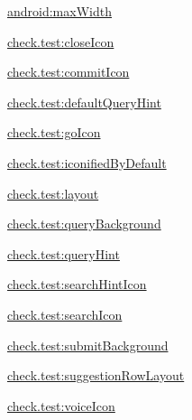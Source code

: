 {\ttfamily \hyperlink{classcheck_1_1test_1_1_r_1_1styleable_a77f942b17351847bdbed74d6b26c17e2}{android\+:max\+Width}}

{\ttfamily \hyperlink{classcheck_1_1test_1_1_r_1_1styleable_adda1bbb19f8d55c5be43c305e20f2e18}{check.\+test\+:close\+Icon}}

{\ttfamily \hyperlink{classcheck_1_1test_1_1_r_1_1styleable_a31409b8f7f4cf0147ae878cb9dd11c99}{check.\+test\+:commit\+Icon}}

{\ttfamily \hyperlink{classcheck_1_1test_1_1_r_1_1styleable_a25fc4426b5d6f7fd9c05b2c7b543a9c7}{check.\+test\+:default\+Query\+Hint}}

{\ttfamily \hyperlink{classcheck_1_1test_1_1_r_1_1styleable_aa1834df2b3dd894df7c2d6e194cf864a}{check.\+test\+:go\+Icon}}

{\ttfamily \hyperlink{classcheck_1_1test_1_1_r_1_1styleable_aa8cd4a6d1145a57929dc88b7db75616a}{check.\+test\+:iconified\+By\+Default}}

{\ttfamily \hyperlink{classcheck_1_1test_1_1_r_1_1styleable_a43de74d589f89c8acfb186f9078f5192}{check.\+test\+:layout}}

{\ttfamily \hyperlink{classcheck_1_1test_1_1_r_1_1styleable_ae1dc74a07b7705c97c66e2f4ed17ee37}{check.\+test\+:query\+Background}}

{\ttfamily \hyperlink{classcheck_1_1test_1_1_r_1_1styleable_a81a033a05b9ad3bb82d2aa9daa757cfb}{check.\+test\+:query\+Hint}}

{\ttfamily \hyperlink{classcheck_1_1test_1_1_r_1_1styleable_ad0538833b27a29b6c19c419c1e948765}{check.\+test\+:search\+Hint\+Icon}}

{\ttfamily \hyperlink{classcheck_1_1test_1_1_r_1_1styleable_ab032023905a333c304872772b4b7aa87}{check.\+test\+:search\+Icon}}

{\ttfamily \hyperlink{classcheck_1_1test_1_1_r_1_1styleable_a85d86db6e7bedfaa5d09b84a2324b42b}{check.\+test\+:submit\+Background}}

{\ttfamily \hyperlink{classcheck_1_1test_1_1_r_1_1styleable_a017153f998c419cbe736bd819098f898}{check.\+test\+:suggestion\+Row\+Layout}}

{\ttfamily \hyperlink{classcheck_1_1test_1_1_r_1_1styleable_acb56cf2aa22fa1d1f6c6bfeed93c46e3}{check.\+test\+:voice\+Icon}}

